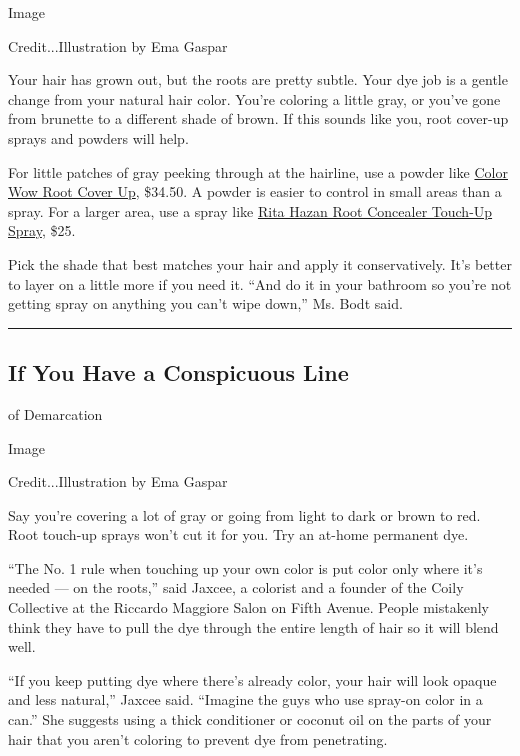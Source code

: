 Image

Credit...Illustration by Ema Gaspar

Your hair has grown out, but the roots are pretty subtle. Your dye job
is a gentle change from your natural hair color. You're coloring a
little gray, or you've gone from brunette to a different shade of brown.
If this sounds like you, root cover-up sprays and powders will help.

For little patches of gray peeking through at the hairline, use a powder
like \href{https://www.colorwowhair.com/us/root-cover-up}{Color Wow Root
Cover Up}, \$34.50. A powder is easier to control in small areas than a
spray. For a larger area, use a spray like
\href{https://ritahazan.com/products/root-concealer-color-spray}{Rita
Hazan Root Concealer Touch-Up Spray}, \$25.

Pick the shade that best matches your hair and apply it conservatively.
It's better to layer on a little more if you need it. ``And do it in
your bathroom so you're not getting spray on anything you can't wipe
down,'' Ms. Bodt said.

\begin{center}\rule{0.5\linewidth}{\linethickness}\end{center}

\hypertarget{if-you-have-a-conspicuous-line}{%
\subsection{If You Have a Conspicuous
Line}\label{if-you-have-a-conspicuous-line}}

of Demarcation

Image

Credit...Illustration by Ema Gaspar

Say you're covering a lot of gray or going from light to dark or brown
to red. Root touch-up sprays won't cut it for you. Try an at-home
permanent dye.

``The No. 1 rule when touching up your own color is put color only where
it's needed --- on the roots,'' said Jaxcee, a colorist and a founder of
the Coily Collective at the Riccardo Maggiore Salon on Fifth Avenue.
People mistakenly think they have to pull the dye through the entire
length of hair so it will blend well.

``If you keep putting dye where there's already color, your hair will
look opaque and less natural,'' Jaxcee said. ``Imagine the guys who use
spray-on color in a can.'' She suggests using a thick conditioner or
coconut oil on the parts of your hair that you aren't coloring to
prevent dye from penetrating.

